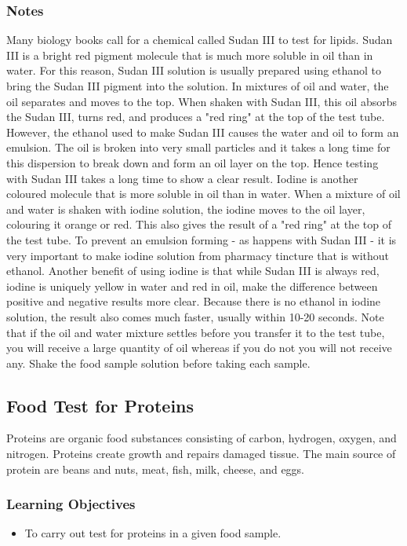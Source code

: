 \subsubsection*{Notes}
Many biology books call for a chemical called Sudan III to test for lipids. Sudan III is a bright red pigment molecule that is much more soluble in oil than in water. For this reason, Sudan III solution is usually prepared using ethanol to bring the Sudan III pigment into the solution. In mixtures of oil and water, the oil separates and moves to the top. When shaken with Sudan III, this oil absorbs the Sudan III, turns red, and produces a "red ring" at the top of the test tube. However, the ethanol used to make Sudan III causes the water and oil to form an emulsion. The oil is broken into very small particles and it takes a long time for this dispersion to break down and form an oil layer on the top. Hence testing with Sudan III takes a long time to show a clear result.
Iodine is another coloured molecule that is more soluble in oil than in water. When a mixture of oil and water is shaken with iodine solution, the iodine moves to the oil layer, colouring it orange or red. This also gives the result of a "red ring" at the top of the test tube. To prevent an emulsion forming - as happens with Sudan III - it is very important to make iodine solution from pharmacy tincture that is without ethanol. Another benefit of using iodine is that while Sudan III is always red, iodine is uniquely yellow in water and red in oil, make the difference between positive and negative results more clear. Because there is no ethanol in iodine solution, the result also comes much faster, usually within 10-20 seconds.
Note that if the oil and water mixture settles before you transfer it to the test tube, you will receive a large quantity of oil whereas if you do not you will not receive any. Shake the food sample solution before taking each sample.

\subsection{Food Test for Proteins}
Proteins are organic food substances consisting of carbon, hydrogen, oxygen, and nitrogen. Proteins create growth and repairs damaged tissue. The main source of protein are beans and nuts, meat, fish, milk, cheese, and eggs.

\subsubsection*{Learning Objectives}
\begin{itemize}
\item{To carry out test for proteins in a given food sample.}
\end{itemize}


